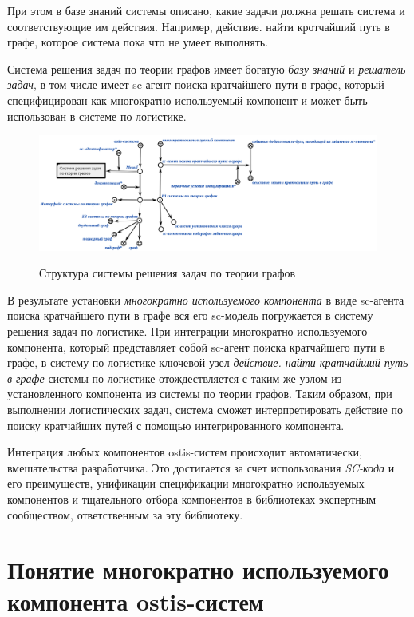 При этом в базе знаний системы описано, какие задачи должна решать система и соответствующие им действия. Например, действие. найти кротчайший путь в графе, которое система пока что не умеет выполнять.

Система решения задач по теории графов имеет богатую \textit{базу знаний} и \textit{решатель задач}, в том числе имеет sc-агент поиска кратчайшего пути в графе, который специфицирован как многократно используемый компонент и может быть использован в системе по логистике.

\begin{figure}[H]
	\caption{Структура системы решения задач по теории графов}
	\includegraphics[scale=0.4]{author/part5/figures/graph_theory_system.png}
	\label{fig:graph_theory_system}
\end{figure}

В результате установки \textit{многократно используемого компонента} в виде sc-агента поиска кратчайшего пути в графе вся его sc-модель погружается в систему решения задач по логистике. При интеграции многократно используемого компонента, который представляет собой sc-агент поиска кратчайшего пути в графе, в систему по логистике ключевой узел \textit{действие. найти кратчайший путь в графе} системы по логистике отождествляется с таким же узлом из установленного компонента из системы по теории графов. Таким образом, при выполнении логистических задач, система сможет интерпретировать действие по поиску кратчайших путей с помощью интегрированного компонента.

Интеграция любых компонентов ostis-систем происходит автоматически,  вмешательства разработчика. Это достигается за счет использования \textit{SC-кода} и его преимуществ, унификации спецификации многократно используемых компонентов и тщательного отбора компонентов в библиотеках экспертным сообществом, ответственным за эту библиотеку.

\section{Понятие многократно используемого компонента ostis-систем}
\label{reusable_component_section}

